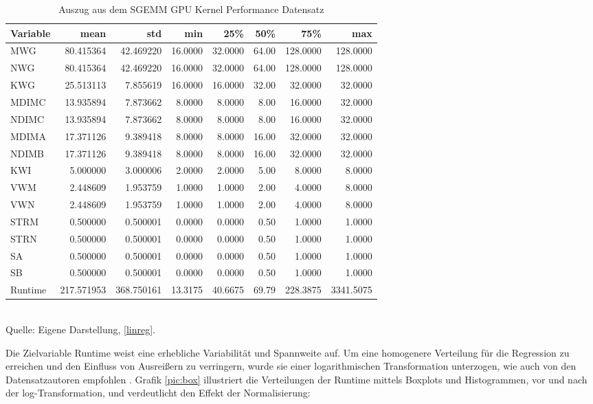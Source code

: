 \begin{table}[!h]
    \caption{Auszug aus dem SGEMM GPU Kernel Performance Datensatz}
    \footnotesize
    \begin{tabularx}{\textwidth}{Xrrrrrrr}
    \toprule
    Variable & mean & std & min & 25\% & 50\% & 75\% & max \\
    \midrule
    MWG & 80.415364 & 42.469220 & 16.0000 & 32.0000 & 64.00 & 128.0000 & 128.0000 \\
    NWG & 80.415364 & 42.469220 & 16.0000 & 32.0000 & 64.00 & 128.0000 & 128.0000 \\
    KWG & 25.513113 & 7.855619 & 16.0000 & 16.0000 & 32.00 & 32.0000 & 32.0000 \\
    MDIMC & 13.935894 & 7.873662 & 8.0000 & 8.0000 & 8.00 & 16.0000 & 32.0000 \\
    NDIMC & 13.935894 & 7.873662 & 8.0000 & 8.0000 & 8.00 & 16.0000 & 32.0000 \\
    MDIMA & 17.371126 & 9.389418 & 8.0000 & 8.0000 & 16.00 & 32.0000 & 32.0000 \\
    NDIMB & 17.371126 & 9.389418 & 8.0000 & 8.0000 & 16.00 & 32.0000 & 32.0000 \\
    KWI & 5.000000 & 3.000006 & 2.0000 & 2.0000 & 5.00 & 8.0000 & 8.0000 \\
    VWM & 2.448609 & 1.953759 & 1.0000 & 1.0000 & 2.00 & 4.0000 & 8.0000 \\
    VWN & 2.448609 & 1.953759 & 1.0000 & 1.0000 & 2.00 & 4.0000 & 8.0000 \\
    STRM & 0.500000 & 0.500001 & 0.0000 & 0.0000 & 0.50 & 1.0000 & 1.0000 \\
    STRN & 0.500000 & 0.500001 & 0.0000 & 0.0000 & 0.50 & 1.0000 & 1.0000 \\
    SA & 0.500000 & 0.500001 & 0.0000 & 0.0000 & 0.50 & 1.0000 & 1.0000 \\
    SB & 0.500000 & 0.500001 & 0.0000 & 0.0000 & 0.50 & 1.0000 & 1.0000 \\
    Runtime & 217.571953 & 368.750161 & 13.3175 & 40.6675 & 69.79 & 228.3875 & 3341.5075 \\
    \bottomrule
    \end{tabularx}
    \label{tab:statistics}
    \normalsize
    \\ Quelle: Eigene Darstellung, \ref{linreg}.
\end{table}

Die Zielvariable Runtime weist eine erhebliche Variabilität und Spannweite auf. 
Um eine homogenere Verteilung für die Regression zu erreichen und den Einfluss 
von Ausreißern zu verringern, wurde sie einer logarithmischen Transformation unterzogen, 
wie auch von den Datensatzautoren empfohlen \cite{misc_sgemm_gpu_kernel_performance_440}. 
Grafik \ref{pic:box} illustriert die Verteilungen der Runtime mittels Boxplots und Histogrammen, 
vor und nach der log-Transformation, und verdeutlicht den Effekt der Normalisierung:

